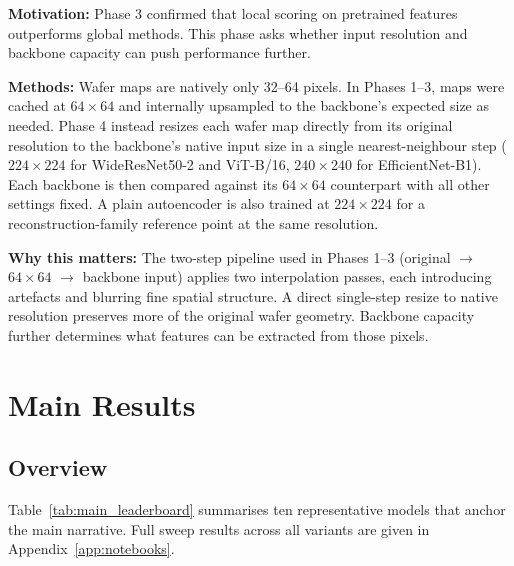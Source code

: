 \documentclass[11pt]{article}
\begin{document}
\textbf{Motivation:} Phase 3 confirmed that local scoring on pretrained features outperforms global methods. This phase
asks whether input resolution and backbone capacity can push performance further.

\textbf{Methods:} Wafer maps are natively only 32--64 pixels. In Phases 1--3, maps were cached at $64\!\times\!64$ and
internally upsampled to the backbone's expected size as needed. Phase 4 instead resizes each wafer map directly
from its original resolution to the backbone's native input size in a single nearest-neighbour step
($224\!\times\!224$ for WideResNet50-2 and ViT-B/16, $240\!\times\!240$ for EfficientNet-B1). Each backbone is then compared against
its $64\!\times\!64$ counterpart with all other settings fixed. A plain autoencoder is also trained at $224\!\times\!224$
for a reconstruction-family reference point at the same resolution.

\textbf{Why this matters:} The two-step pipeline used in Phases 1--3 (original $\to$ $64\!\times\!64$ $\to$ backbone input)
applies two interpolation passes, each introducing artefacts and blurring fine spatial structure. A direct single-step
resize to native resolution preserves more of the original wafer geometry. Backbone capacity further determines what
features can be extracted from those pixels.

\section{Main Results}

\subsection{Overview}

Table~\ref{tab:main_leaderboard} summarises ten representative models
that anchor the main narrative. Full sweep results across all variants are given in
Appendix~\ref{app:notebooks}.
\end{document}

